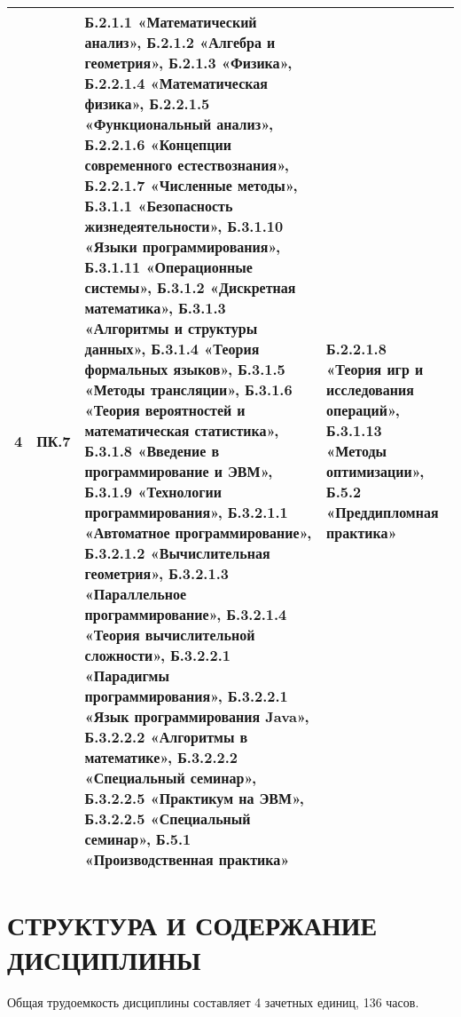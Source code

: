\begin{longtable}{|c|p{}|p{}|p{}|}
4 & ПК.7 & Б.2.1.1 «Математический анализ», Б.2.1.2 «Алгебра и геометрия», Б.2.1.3 «Физика», Б.2.2.1.4 «Математическая физика», Б.2.2.1.5 «Функциональный анализ», Б.2.2.1.6 «Концепции современного естествознания», Б.2.2.1.7 «Численные методы», Б.3.1.1 «Безопасность жизнедеятельности», Б.3.1.10 «Языки программирования», Б.3.1.11 «Операционные системы», Б.3.1.2 «Дискретная математика», Б.3.1.3 «Алгоритмы и структуры данных», Б.3.1.4 «Теория формальных языков», Б.3.1.5 «Методы трансляции», Б.3.1.6 «Теория вероятностей и математическая статистика», Б.3.1.8 «Введение в программирование и ЭВМ», Б.3.1.9 «Технологии программирования», Б.3.2.1.1 «Автоматное программирование», Б.3.2.1.2 «Вычислительная геометрия», Б.3.2.1.3 «Параллельное программирование», Б.3.2.1.4 «Теория вычислительной сложности», Б.3.2.2.1 «Парадигмы программирования», Б.3.2.2.1 «Язык программирования Java», Б.3.2.2.2 «Алгоритмы в математике», Б.3.2.2.2 «Специальный семинар», Б.3.2.2.5 «Практикум на ЭВМ», Б.3.2.2.5 «Специальный семинар», Б.5.1 «Производственная практика» & Б.2.2.1.8 «Теория игр и исследования операций», Б.3.1.13 «Методы оптимизации», Б.5.2 «Преддипломная практика»\\\hline

\end{longtable}

\newpage
\section{СТРУКТУРА И СОДЕРЖАНИЕ ДИСЦИПЛИНЫ}
Общая трудоемкость дисциплины составляет 4 зачетных единиц, 136 часов.

